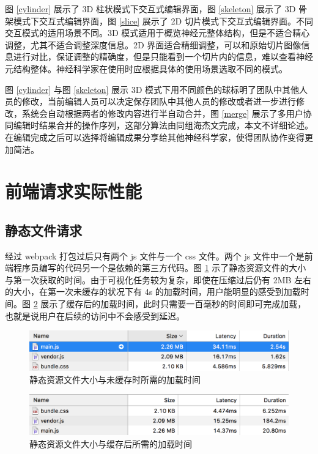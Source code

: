 图 \ref{cylinder} 展示了 3D 柱状模式下交互式编辑界面，图 \ref{skeleton} 展示了 3D 骨架模式下交互式编辑界面，图 \ref{slice} 展示了 2D 切片模式下交互式编辑界面。不同交互模式的适用场景不同。3D 模式适用于概览神经元整体结构，但是不适合精心调整，尤其不适合调整深度信息。2D 界面适合精细调整，可以和原始切片图像信息进行对比，保证调整的精确度，但是只能看到一个切片内的信息，难以查看神经元结构整体。神经科学家在使用时应根据具体的使用场景选取不同的模式。

图 \ref{cylinder} 与图 \ref{skeleton} 展示 3D 模式下用不同颜色的球标明了团队中其他人员的修改，当前编辑人员可以决定保存团队中其他人员的修改或者进一步进行修改，系统会自动根据两者的修改内容进行半自动合并，图 \ref{merge} 展示了多用户协同编辑时结果合并的操作序列，这部分算法由同组海杰文完成，本文不详细论述。在编辑完成之后可以选择将编辑成果分享给其他神经科学家，使得团队协作变得更加简洁。

\section{前端请求实际性能}
\subsection{静态文件请求}
经过 webpack 打包过后只有两个 js 文件与一个 css 文件。两个 js 文件中一个是前端程序员编写的代码另一个是依赖的第三方代码。图 \ref{file-nocache} 示了静态资源文件的大小与第一次获取的时间。由于可视化任务较为复杂，即使在压缩过后仍有 2MB 左右的大小，在第一次未缓存的状况下有 4s 的加载时间，用户能明显的感受到加载时间。图 \ref{file-cache} 展示了缓存后的加载时间，此时只需要一百毫秒的时间即可完成加载，也就是说用户在后续的访问中不会感受到延迟。 

\begin{figure}[!ht]
\centering
\includegraphics[width=148mm]{images/file-nocache}
\caption{静态资源文件大小与未缓存时所需的加载时间}
\label{file-nocache}
\end{figure}

\begin{figure}[!ht]
\centering
\includegraphics[width=148mm]{images/file-cache}
\caption{静态资源文件大小与缓存后所需的加载时间}
\label{file-cache}
\end{figure}

